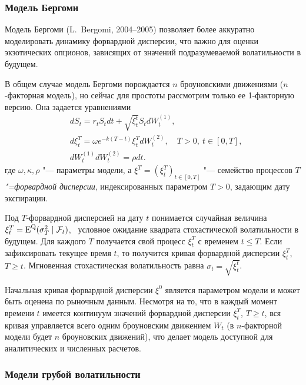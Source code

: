\subsubsection{Модель Бергоми}

Модель Бергоми (L.~Bergomi, 2004--2005) позволяет более аккуратно моделировать динамику форвардной дисперсии, что важно для оценки экзотических опционов, зависящих от значений подразумеваемой волатильности в будущем.

В общем случае модель Бергоми порождается $n$ броуновскими движениями ($n$-факторная модель), но сейчас для простоты рассмотрим только ее 1-факторную версию.
Она задается уравнениями
\begin{align*}
&d S_t = r_tS_t dt + \sqrt{\xi_t^t} S_t d W_t^{(1)},\\
&d \xi_t^T = \omega e^{-k(T-t)} \xi_t^T d W_t^{(2)}, \quad T>0,\ t\in [0,T],\\
&dW_t^{(1)}dW_t^{(2)} = \rho dt.
\end{align*}
где $\omega,\kappa,\rho$ "--- параметры модели, а $\xi^T = (\xi_t^T)_{t\in[0,T]}$ "--- семейство процессов \emph{$T$"=форвардной дисперсии}, индексированных параметром $T>0$, задающим дату экспирации.

Под $T$-форвардной дисперсией на дату $t$ понимается случайная величина $\xi_t^T = \operatorname{E}^{\mathrm{Q}}(\sigma_T^2 \mid \mathcal{F}_t)$, \te\ условное ожидание квадрата стохастической волатильности в будущем. Для каждого $T$ получается свой процесс $\xi^T_t$ с временем $t\le T$. 
Если зафиксировать текущее время $t$, то получится кривая форвардной дисперсии $\xi_t^T$, $T\ge t$. 
Мгновенная стохастическая волатильность равна $\sigma_t = \sqrt{\xi_t^t}$.

Начальная кривая форвардной дисперсии $\xi^0$ является параметром модели и может быть оценена по рыночным данным.
Несмотря на то, что в каждый момент времени $t$ имеется континуум значений форвардной дисперсии $\xi_t^T$, $T\ge t$, вся кривая управляется всего одним броуновским движением $W_t$ (в $n$-факторной модели будет $n$ броуновских движений), что делает модель доступной для аналитических и численных расчетов.


\subsubsection{Модели грубой волатильности}

